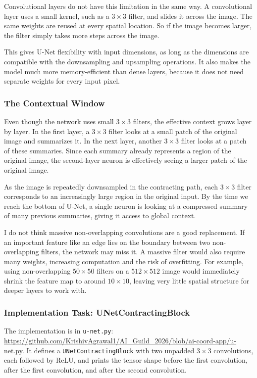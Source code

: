 \documentclass[11pt,a4paper]{article}
\begin{document}
Convolutional layers do not have this limitation in the same way. A convolutional layer uses a small kernel, such as a \(3\times 3\) filter, and slides it across the image. The same weights are reused at every spatial location. So if the image becomes larger, the filter simply takes more steps across the image.

This gives U-Net flexibility with input dimensions, as long as the dimensions are compatible with the downsampling and upsampling operations. It also makes the model much more memory-efficient than dense layers, because it does not need separate weights for every input pixel.

\subsubsection{The Contextual Window}
Even though the network uses small \(3\times 3\) filters, the effective context grows layer by layer. In the first layer, a \(3\times 3\) filter looks at a small patch of the original image and summarizes it. In the next layer, another \(3\times 3\) filter looks at a patch of these summaries. Since each summary already represents a region of the original image, the second-layer neuron is effectively seeing a larger patch of the original image.

As the image is repeatedly downsampled in the contracting path, each \(3\times 3\) filter corresponds to an increasingly large region in the original input. By the time we reach the bottom of U-Net, a single neuron is looking at a compressed summary of many previous summaries, giving it access to global context.

I do not think massive non-overlapping convolutions are a good replacement. If an important feature like an edge lies on the boundary between two non-overlapping filters, the network may miss it. A massive filter would also require many weights, increasing computation and the risk of overfitting. For example, using non-overlapping \(50\times 50\) filters on a \(512\times 512\) image would immediately shrink the feature map to around \(10\times 10\), leaving very little spatial structure for deeper layers to work with.

\subsubsection{Implementation Task: UNetContractingBlock}
The implementation is in \texttt{u-net.py}: \url{https://github.com/KrishivAgrawal1/AI_Guild_2026/blob/ai-coord-app/u-net.py}. It defines a \texttt{UNetContractingBlock} with two unpadded \(3\times 3\) convolutions, each followed by ReLU, and prints the tensor shape before the first convolution, after the first convolution, and after the second convolution.
\end{document}
